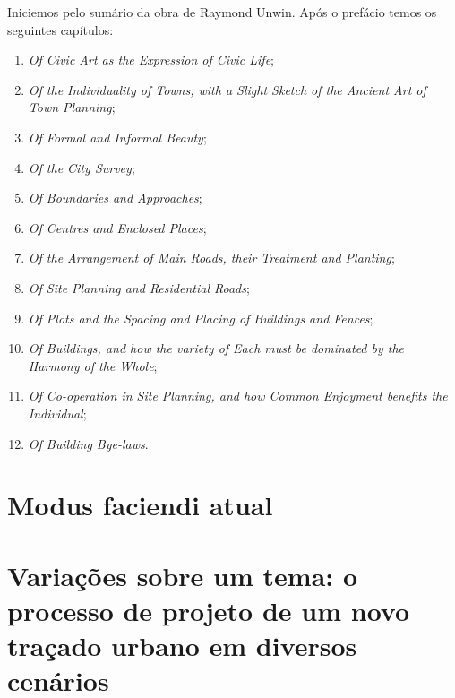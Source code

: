 \documentclass[]{report}
\begin{document}
Iniciemos pelo sumário da obra de Raymond Unwin. Após o prefácio temos os seguintes capítulos:
\begin{enumerate}
	\item \textit{Of Civic Art as the Expression of Civic Life};
	\item \textit{Of the Individuality of Towns, with a Slight Sketch of the Ancient Art of Town Planning};
	\item \textit{Of Formal and Informal Beauty};
	\item \textit{Of the City Survey};
	\item \textit{Of Boundaries and Approaches};
	\item \textit{Of Centres and Enclosed Places};
	\item \textit{Of the Arrangement of Main Roads, their Treatment and Planting};
	\item \textit{Of Site Planning and Residential Roads};
	\item \textit{Of Plots and the Spacing and Placing of Buildings and Fences};
	\item \textit{Of Buildings, and how the variety of Each must be dominated by the Harmony of the Whole};
	\item \textit{Of Co-operation in Site Planning, and how Common Enjoyment benefits the Individual};
	\item \textit{Of Building Bye-laws}.
	\end{enumerate}
	
\chapter{Modus faciendi atual}

\chapter{Variações sobre um tema: o processo de projeto de um novo traçado urbano em diversos cenários}
\end{document}

